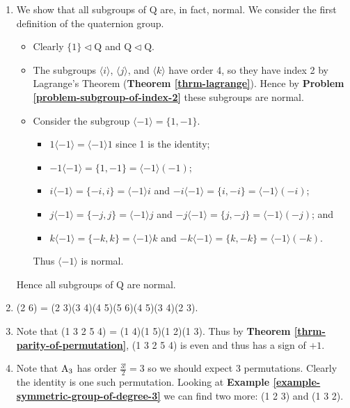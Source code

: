 \begin{enumerate}
    \item We show that all subgroups of $\mathrm{Q}$ are, in fact, normal. We consider the first definition of the quaternion group.
    \begin{itemize}
        \item Clearly $\{1\} \lhd \mathrm{Q}$ and $\mathrm{Q} \lhd \mathrm{Q}$.
        \item The subgroups $\langle i\rangle$, $\langle j\rangle$, and $\langle k\rangle$ have order 4, so they have index 2 by Lagrange's Theorem (\textbf{Theorem \ref{thrm-lagrange}}). Hence by \textbf{Problem \ref{problem-subgroup-of-index-2}} these subgroups are normal.
        \item Consider the subgroup $\langle -1 \rangle = \{1, -1\}$. \begin{itemize}
            \item $1\langle -1 \rangle = \langle -1 \rangle1$ since 1 is the identity;
            \item $-1\langle -1 \rangle = \{1, -1\} = \langle -1 \rangle(-1)$;
            \item $i\langle -1 \rangle = \{-i, i\} = \langle -1 \rangle i$ and $-i\langle -1 \rangle = \{i, -i\} = \langle -1 \rangle (-i)$;
            \item $j\langle -1 \rangle = \{-j, j\} = \langle -1 \rangle j$ and $-j\langle -1 \rangle = \{j, -j\} = \langle -1 \rangle (-j)$; and
            \item $k\langle -1 \rangle = \{-k, k\} = \langle -1 \rangle k$ and $-k\langle -1 \rangle = \{k, -k\} = \langle -1 \rangle (-k)$.
        \end{itemize}
        Thus $\langle -1 \rangle$ is normal.
    \end{itemize}
    Hence all subgroups of $\mathrm{Q}$ are normal.

    \item (2 6) = (2 3)(3 4)(4 5)(5 6)(4 5)(3 4)(2 3).

    \item Note that (1 3 2 5 4) = (1 4)(1 5)(1 2)(1 3). Thus by \textbf{Theorem \ref{thrm-parity-of-permutation}}, (1 3 2 5 4) is even and thus has a sign of $+1$.

    \item Note that $\mathrm{A}_{3}$ has order $\frac{3!}{2} = 3$ so we should expect 3 permutations. Clearly the identity is one such permutation. Looking at \textbf{Example \ref{example-symmetric-group-of-degree-3}} we can find two more: (1 2 3) and (1 3 2).


\end{enumerate}
